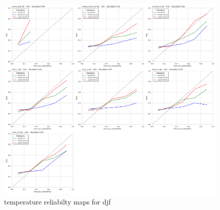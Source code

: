 \begin{figure}[H]
    \centering
    \includegraphics[width=1\linewidth]{plots/prob/rela/rela_diagram_t2m_djf.png}
    \caption{temperature reliabilty maps for djf}
\end{figure}

